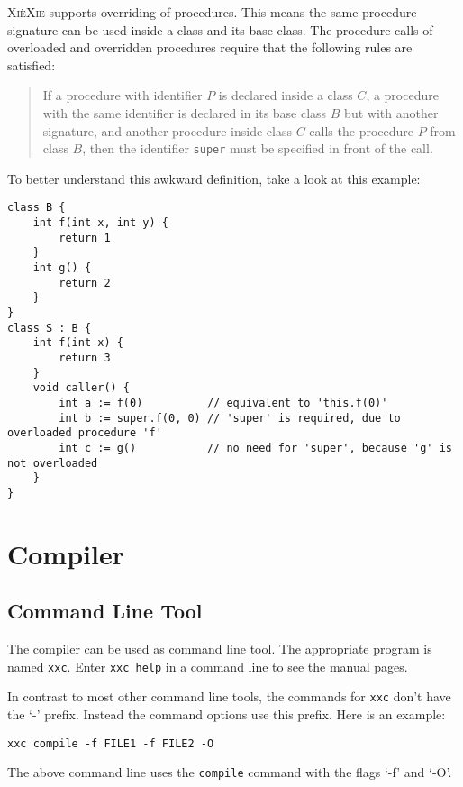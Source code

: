 \documentclass{report}
\def\xiexie{\textsc{Xi\`eXie}\xspace}
\def\xxc{\texttt{xxc}\xspace}
\begin{document}
\xiexie supports overriding of procedures. This means the same procedure signature can be used inside a class and its
base class. The procedure calls of overloaded and overridden procedures require that the following rules are satisfied:
\begin{quote}
	If a procedure with identifier $P$ is declared inside a class $C$, a procedure with the same identifier is declared
	in its base class $B$ but with another signature, and another procedure inside class $C$ calls the procedure $P$
	from class $B$, then the identifier \texttt{super} must be specified in front of the call.
\end{quote}
To better understand this awkward definition, take a look at this example:
\begin{lstlisting}
class B {
    int f(int x, int y) {
        return 1
    }
    int g() {
        return 2
    }
}
class S : B {
    int f(int x) {
        return 3
    }
    void caller() {
        int a := f(0)          // equivalent to 'this.f(0)'
        int b := super.f(0, 0) // 'super' is required, due to overloaded procedure 'f'
        int c := g()           // no need for 'super', because 'g' is not overloaded
    }
}
\end{lstlisting}



\chapter{Compiler}



\section{Command Line Tool}

The compiler can be used as command line tool. The appropriate program is named \xxc.
Enter \texttt{xxc help} in a command line to see the manual pages.

In contrast to most other command line tools, the commands for \xxc don't have the `-' prefix.
Instead the command options use this prefix. Here is an example:
\begin{lstlisting}
xxc compile -f FILE1 -f FILE2 -O
\end{lstlisting}
The above command line uses the \texttt{compile} command with the flags `-f' and `-O'.
\end{document}
